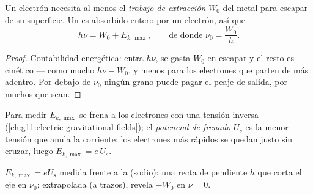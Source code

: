 \begin{theorem}\label{thm:g12:quantum-world:einstein}
Un electrón necesita al menos el \emph{trabajo de
extracción} $W_0$ del metal para escapar de su
superficie. Un  es absorbido entero por un electrón, así que
\[
h\nu = W_0 + E_{k,\max}, \qquad \text{de donde } \nu_0 = \frac{W_0}{h}.
\]
\end{theorem}

\begin{proof}
Contabilidad energética: entra $h\nu$, se gasta $W_0$ en escapar y el resto es
cinético --- como mucho $h\nu - W_0$, y menos para los electrones que parten de más
adentro. Por debajo de $\nu_0$ ningún grano puede pagar el peaje de salida, por
muchos que sean.
\end{proof}

\begin{definition}\label{def:g12:quantum-world:stopping}
Para medir $E_{k,\max}$ se frena a los electrones con una tensión inversa
(\cref{ch:g11:electric-gravitational-fields}); el \emph{potencial de
frenado} $U_s$ es la menor tensión que anula la corriente:
los electrones más rápidos se quedan justo sin cruzar, luego $E_{k,\max} = e\,U_s$.
\end{definition}

\begin{omfigure}

{\small $E_{k,\max} = eU_s$ medida frente a la  (sodio): una recta de
pendiente $h$ que corta el eje en $\nu_0$; extrapolada (a trazos), revela $-W_0$ en
$\nu = 0$.}
\end{omfigure}

